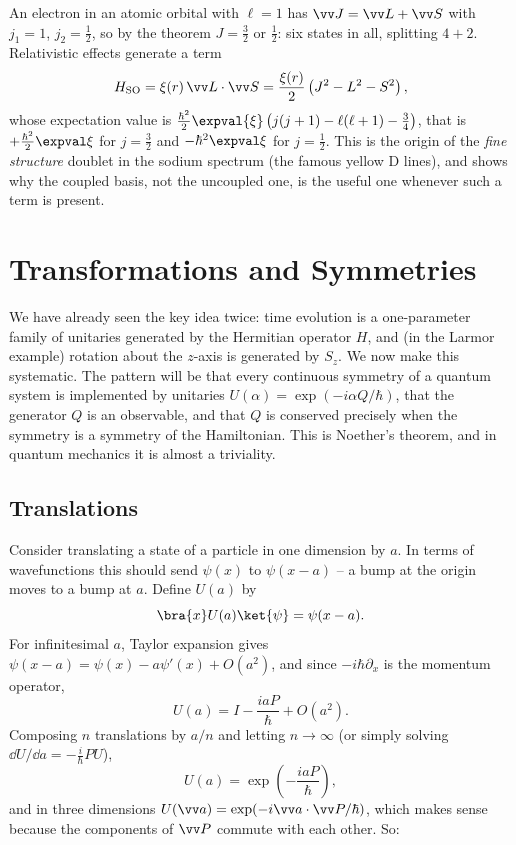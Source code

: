 \begin{example}
    An electron in an atomic orbital with $\ell = 1$ has $\vv J = \vv L + \vv S$ with $j_1 = 1$, $j_2 = \frac12$, so by the theorem $J = \frac32$ or $\frac12$: six states in all, splitting $4+2$. Relativistic effects generate a term
    $$
    H_{\mathrm{SO}} = \xi(r)\, \vv L \cdot \vv S = \frac{\xi(r)}{2}\left( J^2 - L^2 - S^2 \right),
    $$
    whose expectation value is $\frac{\hbar^2}{2}\expval{\xi}\left(j(j+1)-\ell(\ell+1)-\frac34\right)$, that is $+\frac{\hbar^2}{2}\expval\xi$ for $j = \frac32$ and $-\hbar^2\expval\xi$ for $j = \frac12$. This is the origin of the \emph{fine structure} doublet in the sodium spectrum (the famous yellow D lines), and shows why the coupled basis, not the uncoupled one, is the useful one whenever such a term is present.
\end{example}

\section{Transformations and Symmetries}\label{sec:symmetry}

We have already seen the key idea twice: time evolution is a one-parameter family of unitaries generated by the Hermitian operator $H$, and (in the Larmor example) rotation about the $z$-axis is generated by $S_z$. We now make this systematic. The pattern will be that every continuous symmetry of a quantum system is implemented by unitaries $U(\alpha) = \exp(-i\alpha Q/\hbar)$, that the generator $Q$ is an observable, and that $Q$ is conserved precisely when the symmetry is a symmetry of the Hamiltonian. This is Noether's theorem, and in quantum mechanics it is almost a triviality.

\subsection{Translations}

Consider translating a state of a particle in one dimension by $a$. In terms of wavefunctions this should send $\psi(x)$ to $\psi(x-a)$ -- a bump at the origin moves to a bump at $a$. Define $U(a)$ by
$$
\bra{x}U(a)\ket{\psi} = \psi(x - a).
$$
For infinitesimal $a$, Taylor expansion gives $\psi(x-a) = \psi(x) - a\psi'(x) + O(a^2)$, and since $-i\hbar\partial_x$ is the momentum operator,
$$
U(a) = I - \frac{i a P}{\hbar} + O(a^2).
$$
Composing $n$ translations by $a/n$ and letting $n \to \infty$ (or simply solving $\dd U/\dd a = -\frac{i}{\hbar}PU$),
$$
U(a) = \exp\left(-\frac{iaP}{\hbar}\right),
$$
and in three dimensions $U(\vv a) = \exp(-i\vv a \cdot \vv P/\hbar)$, which makes sense because the components of $\vv P$ commute with each other. So:

